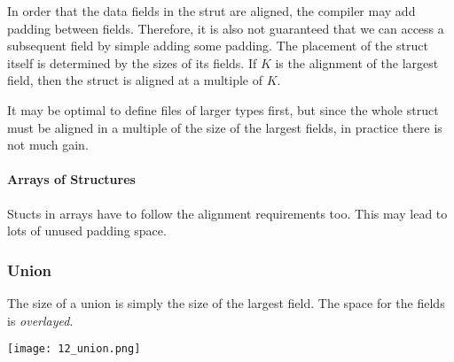 In order that the data fields in the strut are aligned, the compiler may add padding between fields. Therefore, it is also not guaranteed that we can access a subsequent field by simple adding some padding. The placement of the struct itself is determined by the sizes of its fields. If $K$ is the alignment of the largest field, then the struct is aligned at a multiple of $K$.

It may be optimal to define files of larger types first, but since the whole struct must be aligned in a multiple of the size of the largest fields, in practice there is not much gain.

\paragraph{Arrays of Structures}
Stucts in arrays have to follow the alignment requirements too. This may lead to lots of unused padding space.

\subsubsection{Union}
The size of a union is simply the size of the largest field. The space for the fields is \textit{overlayed}.

\texttt{[image: 12\_union.png]}
